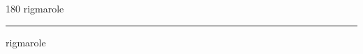 
\begin{frame}
\begin{center}
\begin{turn}{180}
{\fontsize{2.5cm}{1em}\selectfont rigmarole}
\end{turn}
\vspace{1em}\par  
\hrule
\vspace{1em}\par  
{\fontsize{2.5cm}{1em}\selectfont rigmarole}
\end{center}
\end{frame}

